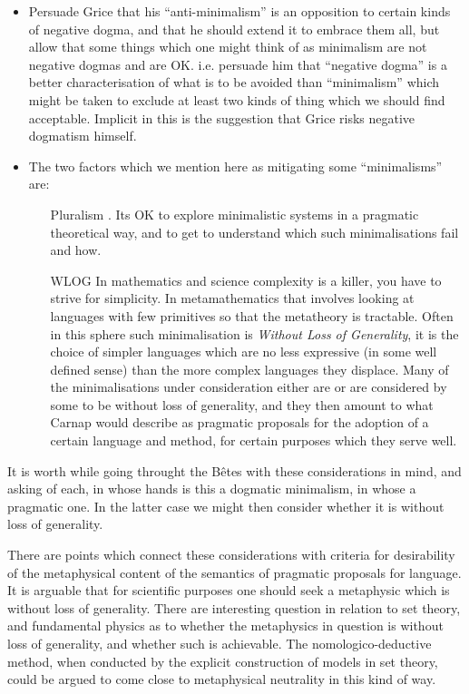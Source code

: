 \documentclass[10pt,titlepage]{book}
\begin{document}
\begin{itemize}
\item Persuade Grice that his ``anti-minimalism'' is an opposition to certain kinds of negative dogma, and that he should extend it to embrace them all, but allow that some things which one might think of as minimalism are not negative dogmas and are OK.
i.e. persuade him that ``negative dogma'' is a better characterisation of what is to be avoided than ``minimalism'' which might be taken to exclude at least two kinds of thing which we should find acceptable.
Implicit in this is the suggestion that Grice risks negative dogmatism himself.

\item The two factors which we mention here as mitigating some ``minimalisms'' are:

\begin{itemize}

\item [Pluralism].  Its OK to explore minimalistic systems in a pragmatic theoretical way, and to get to understand which such minimalisations fail and how.

\item [WLOG] In mathematics and science complexity is a killer, you have to strive for simplicity.
In metamathematics that involves looking at languages with few primitives so that the metatheory is tractable.
Often in this sphere such minimalisation is {\it Without Loss of Generality}, it is the choice of simpler languages which are no less expressive (in some well defined sense) than the more complex languages they displace.
Many of the minimalisations under consideration either are or are considered by some to be without loss of generality, and they then amount to what Carnap would describe as pragmatic proposals for the adoption of a certain language and method, for certain purposes which they serve well.
\end{itemize}

\end{itemize}

It is worth while going throught the B\^etes with these considerations in mind, and asking of each, in whose hands is this a dogmatic minimalism, in whose a pragmatic one.
In the latter case we might then consider whether it is without loss of generality.

There are points which connect these considerations with criteria for desirability of the metaphysical content of the semantics of pragmatic proposals for language.
It is arguable that for scientific purposes one should seek a metaphysic which is without loss of generality.
There are interesting question in relation to set theory, and fundamental physics as to whether the metaphysics in question is without loss of generality, and whether such is achievable.
The nomologico-deductive method, when conducted by the explicit construction of models in set theory, could be argued to come close to metaphysical neutrality in this kind of way.
\end{document}
